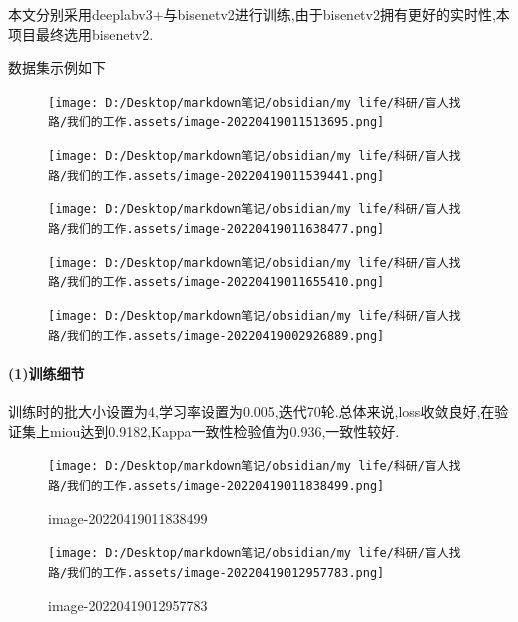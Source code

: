 \documentclass[]{article}
\let\oldparagraph\paragraph
\renewcommand{\paragraph}[1]{\oldparagraph{#1}\mbox{}}
\begin{document}
本文分别采用deeplabv3+与bisenetv2进行训练,由于bisenetv2拥有更好的实时性,本项目最终选用bisenetv2.

数据集示例如下

\begin{figure}
\centering
\texttt{[image: D:/Desktop/markdown笔记/obsidian/my life/科研/盲人找路/我们的工作.assets/image-20220419011513695.png]}
\caption{}
\end{figure}

\begin{figure}
\centering
\texttt{[image: D:/Desktop/markdown笔记/obsidian/my life/科研/盲人找路/我们的工作.assets/image-20220419011539441.png]}
\caption{}
\end{figure}

\begin{figure}
\centering
\texttt{[image: D:/Desktop/markdown笔记/obsidian/my life/科研/盲人找路/我们的工作.assets/image-20220419011638477.png]}
\caption{}
\end{figure}

\begin{figure}
\centering
\texttt{[image: D:/Desktop/markdown笔记/obsidian/my life/科研/盲人找路/我们的工作.assets/image-20220419011655410.png]}
\caption{}
\end{figure}

\begin{figure}
\centering
\texttt{[image: D:/Desktop/markdown笔记/obsidian/my life/科研/盲人找路/我们的工作.assets/image-20220419002926889.png]}
\caption{}
\end{figure}

\hypertarget{1ux8badux7ec3ux7ec6ux8282}{%
\paragraph{(1)训练细节}\label{1ux8badux7ec3ux7ec6ux8282}}

训练时的批大小设置为4,学习率设置为0.005,迭代70轮.总体来说,loss收敛良好,在验证集上miou达到0.9182,Kappa一致性检验值为0.936,一致性较好.

\begin{figure}
\centering
\texttt{[image: D:/Desktop/markdown笔记/obsidian/my life/科研/盲人找路/我们的工作.assets/image-20220419011838499.png]}
\caption{image-20220419011838499}
\end{figure}

\begin{figure}
\centering
\texttt{[image: D:/Desktop/markdown笔记/obsidian/my life/科研/盲人找路/我们的工作.assets/image-20220419012957783.png]}
\caption{image-20220419012957783}
\end{figure}
\end{document}
